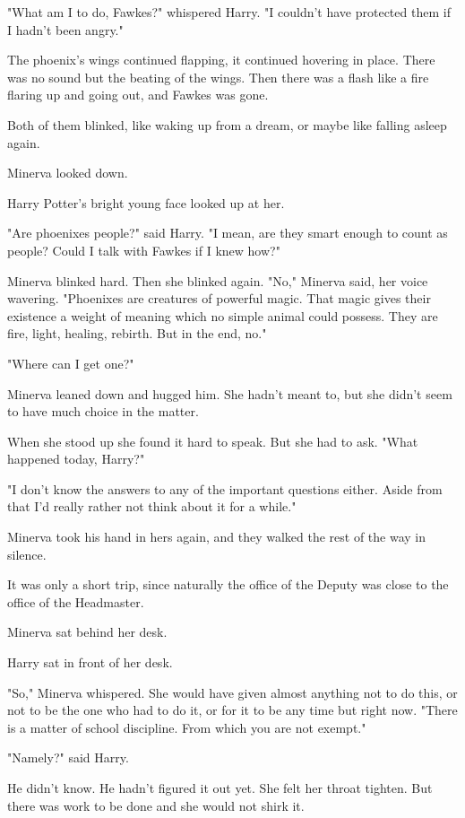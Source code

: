 "What am I to do, Fawkes?" whispered Harry. "I couldn't have protected them if 
I hadn't been angry."

The phoenix's wings continued flapping, it continued hovering in place. There 
was no sound but the beating of the wings. Then there was a flash like a fire 
flaring up and going out, and Fawkes was gone.

Both of them blinked, like waking up from a dream, or maybe like falling asleep 
again.

Minerva looked down.

Harry Potter's bright young face looked up at her.

"Are phoenixes people?" said Harry. "I mean, are they smart enough to count as 
people? Could I talk with Fawkes if I knew how?"

Minerva blinked hard. Then she blinked again. "No," Minerva said, her voice 
wavering. "Phoenixes are creatures of powerful magic. That magic gives their 
existence a weight of meaning which no simple animal could possess. They are 
fire, light, healing, rebirth. But in the end, no."

"Where can I get one?"

Minerva leaned down and hugged him. She hadn't meant to, but she didn't seem to 
have much choice in the matter.

When she stood up she found it hard to speak. But she had to ask. "What 
happened today, Harry?"

"I don't know the answers to any of the important questions either. Aside from 
that I'd really rather not think about it for a while."

Minerva took his hand in hers again, and they walked the rest of the way in 
silence.

It was only a short trip, since naturally the office of the Deputy was close to 
the office of the Headmaster.

Minerva sat behind her desk.

Harry sat in front of her desk.

"So," Minerva whispered. She would have given almost anything not to do this, 
or not to be the one who had to do it, or for it to be any time but right now. 
"There is a matter of school discipline. From which you are not exempt."

"Namely?" said Harry.

He didn't know. He hadn't figured it out yet. She felt her throat tighten. But 
there was work to be done and she would not shirk it.

